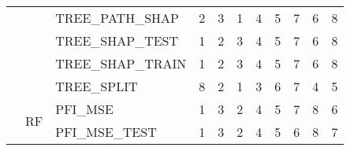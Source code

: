 \begin{table}
\begin{tabular}{lllrrrrrrrr}
 &  & TREE\_PATH\_SHAP & {\cellcolor[HTML]{6788EE}} \color[HTML]{F1F1F1} 2 & {\cellcolor[HTML]{9ABBFF}} \color[HTML]{000000} 3 & {\cellcolor[HTML]{3B4CC0}} \color[HTML]{F1F1F1} 1 & {\cellcolor[HTML]{C9D7F0}} \color[HTML]{000000} 4 & {\cellcolor[HTML]{EDD1C2}} \color[HTML]{000000} 5 & {\cellcolor[HTML]{E26952}} \color[HTML]{F1F1F1} 7 & {\cellcolor[HTML]{F7A889}} \color[HTML]{000000} 6 & {\cellcolor[HTML]{B40426}} \color[HTML]{F1F1F1} 8 \\
 &  & TREE\_SHAP\_TEST & {\cellcolor[HTML]{3B4CC0}} \color[HTML]{F1F1F1} 1 & {\cellcolor[HTML]{6788EE}} \color[HTML]{F1F1F1} 2 & {\cellcolor[HTML]{9ABBFF}} \color[HTML]{000000} 3 & {\cellcolor[HTML]{C9D7F0}} \color[HTML]{000000} 4 & {\cellcolor[HTML]{EDD1C2}} \color[HTML]{000000} 5 & {\cellcolor[HTML]{E26952}} \color[HTML]{F1F1F1} 7 & {\cellcolor[HTML]{F7A889}} \color[HTML]{000000} 6 & {\cellcolor[HTML]{B40426}} \color[HTML]{F1F1F1} 8 \\
 &  & TREE\_SHAP\_TRAIN & {\cellcolor[HTML]{3B4CC0}} \color[HTML]{F1F1F1} 1 & {\cellcolor[HTML]{6788EE}} \color[HTML]{F1F1F1} 2 & {\cellcolor[HTML]{9ABBFF}} \color[HTML]{000000} 3 & {\cellcolor[HTML]{C9D7F0}} \color[HTML]{000000} 4 & {\cellcolor[HTML]{EDD1C2}} \color[HTML]{000000} 5 & {\cellcolor[HTML]{E26952}} \color[HTML]{F1F1F1} 7 & {\cellcolor[HTML]{F7A889}} \color[HTML]{000000} 6 & {\cellcolor[HTML]{B40426}} \color[HTML]{F1F1F1} 8 \\
 &  & TREE\_SPLIT & {\cellcolor[HTML]{B40426}} \color[HTML]{F1F1F1} 8 & {\cellcolor[HTML]{6788EE}} \color[HTML]{F1F1F1} 2 & {\cellcolor[HTML]{3B4CC0}} \color[HTML]{F1F1F1} 1 & {\cellcolor[HTML]{9ABBFF}} \color[HTML]{000000} 3 & {\cellcolor[HTML]{F7A889}} \color[HTML]{000000} 6 & {\cellcolor[HTML]{E26952}} \color[HTML]{F1F1F1} 7 & {\cellcolor[HTML]{C9D7F0}} \color[HTML]{000000} 4 & {\cellcolor[HTML]{EDD1C2}} \color[HTML]{000000} 5 \\
\cline{2-11}
 & \multirow[c]{9}{*}{RF} & PFI\_MSE & {\cellcolor[HTML]{3B4CC0}} \color[HTML]{F1F1F1} 1 & {\cellcolor[HTML]{9ABBFF}} \color[HTML]{000000} 3 & {\cellcolor[HTML]{6788EE}} \color[HTML]{F1F1F1} 2 & {\cellcolor[HTML]{C9D7F0}} \color[HTML]{000000} 4 & {\cellcolor[HTML]{EDD1C2}} \color[HTML]{000000} 5 & {\cellcolor[HTML]{E26952}} \color[HTML]{F1F1F1} 7 & {\cellcolor[HTML]{B40426}} \color[HTML]{F1F1F1} 8 & {\cellcolor[HTML]{F7A889}} \color[HTML]{000000} 6 \\
 &  & PFI\_MSE\_TEST & {\cellcolor[HTML]{3B4CC0}} \color[HTML]{F1F1F1} 1 & {\cellcolor[HTML]{9ABBFF}} \color[HTML]{000000} 3 & {\cellcolor[HTML]{6788EE}} \color[HTML]{F1F1F1} 2 & {\cellcolor[HTML]{C9D7F0}} \color[HTML]{000000} 4 & {\cellcolor[HTML]{EDD1C2}} \color[HTML]{000000} 5 & {\cellcolor[HTML]{F7A889}} \color[HTML]{000000} 6 & {\cellcolor[HTML]{B40426}} \color[HTML]{F1F1F1} 8 & {\cellcolor[HTML]{E26952}} \color[HTML]{F1F1F1} 7 \\

\end{tabular}
\end{table}
